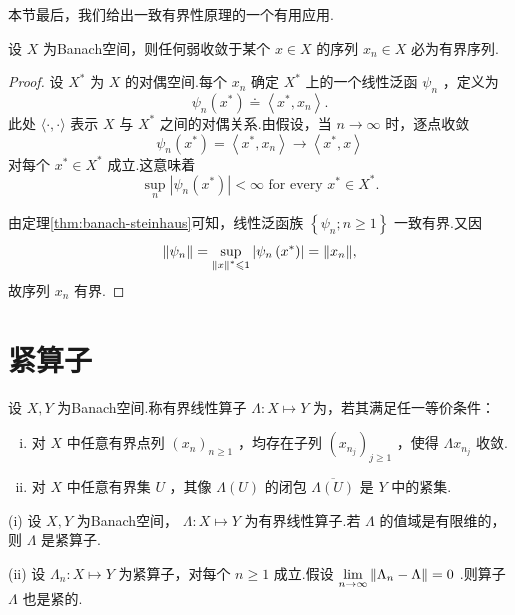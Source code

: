 本节最后，我们给出一致有界性原理的一个有用应用.

\begin{corollary}[弱收敛序列必有界]\label{cor:weakly-convergent-bounded}
设 $X$ 为Banach空间，则任何弱收敛于某个 $x \in  X$ 的序列 ${x}_{n} \in  X$ 必为有界序列.
\end{corollary}

\begin{proof}
设 ${X}^{ * }$ 为 $X$ 的对偶空间.每个 ${x}_{n}$ 确定 ${X}^{ * }$ 上的一个线性泛函 ${\psi }_{n}$ ，定义为
\[
{\psi }_{n}\left( {x}^{ * }\right)  \doteq  \left\langle  {{x}^{ * },{x}_{n}}\right\rangle  .
\]
此处 $\langle  \cdot  , \cdot  \rangle$ 表示 $X$ 与 ${X}^{ * }$ 之间的对偶关系.由假设，当 $n \rightarrow  \infty$ 时，逐点收敛
\[
{\psi }_{n}\left( {x}^{ * }\right)  =  \left\langle  {{x}^{ * },{x}_{n}}\right\rangle   \rightarrow  \left\langle  {{x}^{ * },x}\right\rangle
\]
对每个 ${x}^{ * } \in  {X}^{ * }$ 成立.这意味着
\[
\mathop{\sup }\limits_{n}\left| {{\psi }_{n}\left( {x}^{ * }\right) }\right|  < \infty \text{ for every }{x}^{ * } \in  {X}^{ * }.
\]

由定理\ref{thm:banach-steinhaus}可知，线性泛函族 $\left\{  {{\psi }_{n};n \geq  1}\right\}$ 一致有界.又因
\[
\norm{{\psi }_{n}} = \mathop{\sup }\limits_{{\norm{x}^{ * } \leqslant  1}}\left| {{\psi }_{n}\left( {x}^{ * }\right) }\right|  = \norm{{x}_{n}},
\]
故序列 ${x}_{n}$ 有界.
\end{proof}

\section{紧算子}

\begin{definition}[紧算子]
    设 $X,Y$ 为Banach空间.称有界线性算子 $\Lambda  : X \mapsto  Y$ 为，若其满足任一等价条件：
    \begin{enumerate}[(i)]
        \item 对 $X$ 中任意有界点列 ${\left( {x}_{n}\right) }_{n \geq  1}$ ，均存在子列 ${\left( {x}_{{n}_{j}}\right) }_{j \geq  1}$ ，使得 $\Lambda {x}_{{n}_{j}}$ 收敛.
        \item 对 $X$ 中任意有界集 $U$ ，其像 $\Lambda \left( U\right)$ 的闭包 $\overline{\Lambda \left( U\right) }$ 是 $Y$ 中的紧集.
    \end{enumerate}
\end{definition}


\begin{theorem}[紧算子的例子]\label{thm:compact-examples}
(i) 设 $X,Y$ 为Banach空间， $\Lambda  : X \mapsto  Y$ 为有界线性算子.若 $\Lambda$ 的值域是有限维的，则 $\Lambda$ 是紧算子.

(ii) 设 ${\Lambda }_{n} : X \mapsto  Y$ 为紧算子，对每个 $n \geq  1$ 成立.假设 $\mathop{\lim }\limits_{{n \rightarrow  \infty }}\norm{{\Lambda }_{n} - \Lambda } = 0$ .则算子 $\Lambda$ 也是紧的.
\end{theorem}

